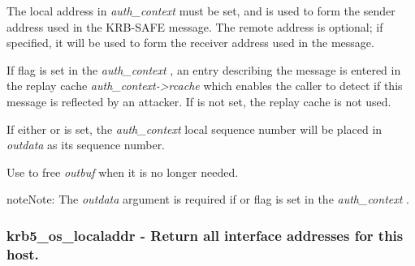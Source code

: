 \documentclass[letterpaper,10pt,english]{sphinxmanual}
\begin{document}
The local address in \emph{auth\_context} must be set, and is used to form the sender address used in the KRB-SAFE message. The remote address is optional; if specified, it will be used to form the receiver address used in the message.

If {\hyperref[appdev/refs/macros/KRB5_AUTH_CONTEXT_DO_TIME:KRB5_AUTH_CONTEXT_DO_TIME]{}} flag is set in the \emph{auth\_context} , an entry describing the message is entered in the replay cache \emph{auth\_context-\textgreater{}rcache} which enables the caller to detect if this message is reflected by an attacker. If {\hyperref[appdev/refs/macros/KRB5_AUTH_CONTEXT_DO_TIME:KRB5_AUTH_CONTEXT_DO_TIME]{}} is not set, the replay cache is not used.

If either {\hyperref[appdev/refs/macros/KRB5_AUTH_CONTEXT_DO_SEQUENCE:KRB5_AUTH_CONTEXT_DO_SEQUENCE]{}} or {\hyperref[appdev/refs/macros/KRB5_AUTH_CONTEXT_RET_SEQUENCE:KRB5_AUTH_CONTEXT_RET_SEQUENCE]{}} is set, the \emph{auth\_context} local sequence number will be placed in \emph{outdata} as its sequence number.

Use {\hyperref[appdev/refs/api/krb5_free_data_contents:c.krb5_free_data_contents]{}} to free \emph{outbuf} when it is no longer needed.

\begin{notice}{note}{Note:}
The \emph{outdata} argument is required if {\hyperref[appdev/refs/macros/KRB5_AUTH_CONTEXT_RET_TIME:KRB5_AUTH_CONTEXT_RET_TIME]{}} or {\hyperref[appdev/refs/macros/KRB5_AUTH_CONTEXT_RET_SEQUENCE:KRB5_AUTH_CONTEXT_RET_SEQUENCE]{}} flag is set in the \emph{auth\_context} .
\end{notice}


\subsubsection{krb5\_os\_localaddr -  Return all interface addresses for this host.}
\label{appdev/refs/api/krb5_os_localaddr:krb5-os-localaddr-return-all-interface-addresses-for-this-host}\label{appdev/refs/api/krb5_os_localaddr::doc}

\begin{fulllineitems}
\label{appdev/refs/api/krb5_os_localaddr:c.krb5_os_localaddr}
\end{fulllineitems}
\end{document}
